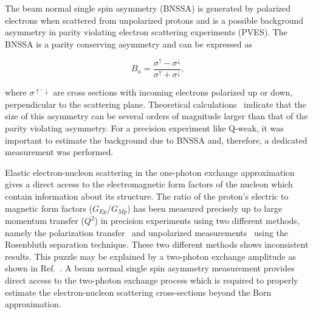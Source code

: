 The beam normal single spin asymmetry (BNSSA) is generated by polarized electrons when scattered from unpolarized protons and is a possible background asymmetry in parity violating electron scattering experiments (PVES). 
The BNSSA is a  parity conserving asymmetry and can be expressed as 

\begin{equation} \label{equ:transverse20}
B_{n} = \frac{\sigma^{\uparrow} - \sigma^{\downarrow} }{\sigma^{\uparrow} + \sigma^{\downarrow}}, 
\end{equation}

\noindent
where $\sigma^{\uparrow,\downarrow}$ are cross sections with incoming electrons polarized up or down, perpendicular to the scattering plane. 
Theoretical calculations~\cite{Arrington2011782} indicate that the size of this asymmetry can be several orders of magnitude larger than that of the parity violating asymmetry. 
For a precision experiment like Q-weak, it was important to estimate the background due to BNSSA and, therefore, a dedicated measurement was performed. 

Elastic electron-nucleon scattering in the one-photon exchange approximation gives a direct access to the electromagnetic form factors of the nucleon which contain information about its structure. The ratio of the proton's electric to magnetic form factors ($G_{Ep}$/$G_{Mp}$) has been measured precisely up to large momentum transfer ($Q^{2}$) in precision experiments using two different methods, namely the polarization transfer~\cite{PhysRevLett.84.1398, PhysRevLett.88.092301} and unpolarized measurements~\cite{PhysRevD.50.5491, PhysRevC.70.015206, Arrington:2003tq} using the Rosenbluth separation technique. These two different methods shows inconsistent results.
This puzzle may be explained by a two-photon exchange amplitude as shown in Ref.~\cite{PhysRevLett.91.142303}.
A beam normal single spin asymmetry measurement provides direct access to the two-photon exchange process which is required to properly estimate the electron-nucleon scattering cross-sections beyond the Born approximation.


